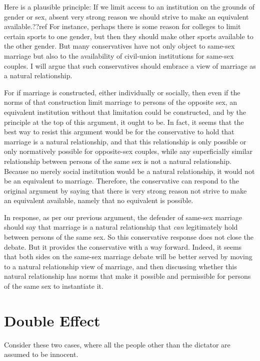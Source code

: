 Here is a plausible principle: If we limit access to an institution on the grounds of gender or sex, absent very strong reason we should strive to make an equivalent
available.??ref For instance, perhaps there is some reason for colleges to limit certain sports to one gender, but then they should make other sports available
to the other gender.
But many conservatives have not only object to same-sex marriage but also to the availability of civil-union institutions for same-sex couples. I will argue that
such conservatives should embrace a view of marriage as a natural relationship.

For if marriage is constructed, either individually or socially, then even if the norms of that construction limit marriage to persons of the opposite sex, an
equivalent institution without that limitation could be constructed, and by the principle at the top of this argument, it ought to be. In fact, it seems that
the best way to resist this argument would be for the conservative to hold that marriage is a natural relationship, and that this relationship is only possible
or only normatively possible for opposite-sex couples, while any superficially similar relationship between persons of the same sex is not a natural relationship.
Because no merely social institution would be a natural relationship, it would not be an equivalent to marriage. Therefore, the conservative can respond to the
original argument by saying that there is very strong reason not strive to make an equivalent available, namely that no equivalent is possible.

In response, as per our previous argument, the defender of same-sex marriage should say that marriage is a natural relationship that \textit{can} legitimately
hold between persons of the same sex. So this conservative response does not close the debate. But it provides the conservative with a way forward. Indeed,
it seems that both sides on the same-sex marriage debate will be better served by moving to a natural relationship view of marriage, and then discussing whether
this natural relationship has norms that make it possible and permissible for persons of the same sex to instantiate it.

\section{Double Effect}
Consider these two cases, where all the people other than the dictator are assumed to be innocent.

